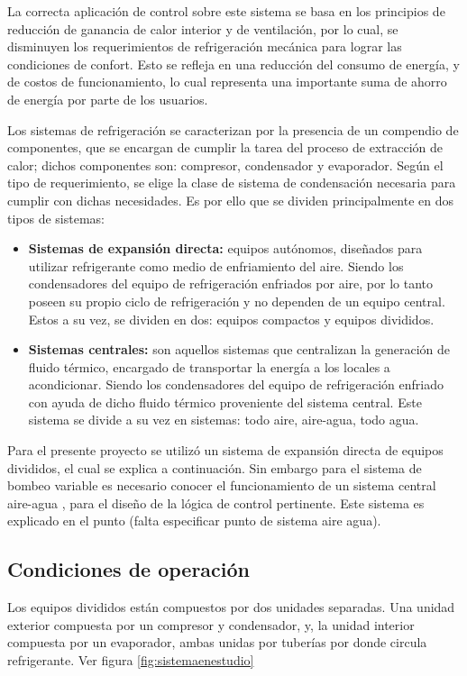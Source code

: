 La correcta aplicación de control sobre este sistema se basa en los
principios de reducción de ganancia de calor interior y de
ventilación, por lo cual, se disminuyen los requerimientos de
refrigeración mecánica para lograr las condiciones de confort. Esto se
refleja en una reducción del consumo de energía, y de costos de
funcionamiento, lo cual representa una importante suma de ahorro de energía por parte de los usuarios.

Los sistemas de refrigeración se caracterizan por la presencia de un compendio de componentes, que se encargan de cumplir la tarea del proceso de extracción de calor; dichos componentes son: compresor, condensador y evaporador. Según el tipo de requerimiento, se elige la clase de sistema de condensación necesaria para cumplir con dichas necesidades. Es por ello que se dividen principalmente en dos tipos de sistemas:
\begin{itemize}
    \item \textbf{Sistemas de expansión directa:}
equipos autónomos, diseñados para utilizar refrigerante como medio de enfriamiento del aire. Siendo los condensadores del equipo de refrigeración enfriados por aire, por lo tanto poseen su propio ciclo de refrigeración y no dependen de un equipo central. Estos a su vez, se dividen en dos: equipos compactos y equipos divididos.

\item \textbf{Sistemas centrales:}
son aquellos sistemas que centralizan la
generación de fluido térmico, encargado de transportar la energía a los locales a acondicionar. Siendo los condensadores del equipo de
refrigeración enfriado con ayuda de dicho fluido térmico proveniente
del sistema central. Este sistema se divide a su vez en sistemas: todo aire, aire-agua, todo agua.
\end{itemize}

Para el presente proyecto se utilizó un sistema de expansión directa de equipos divididos, el cual se explica a continuación. Sin embargo
para el sistema de bombeo variable es necesario conocer el
funcionamiento de un sistema central  aire-agua , para el diseño de la
lógica de control pertinente. Este sistema es explicado en el punto (falta especificar punto de sistema aire agua).

\subsection{Condiciones de operación}
Los equipos divididos están compuestos por dos unidades separadas. Una unidad exterior compuesta por un compresor y condensador, y, la unidad interior compuesta por un evaporador, ambas unidas por tuberías por donde circula refrigerante. Ver figura \ref{fig:sistemaenestudio}

